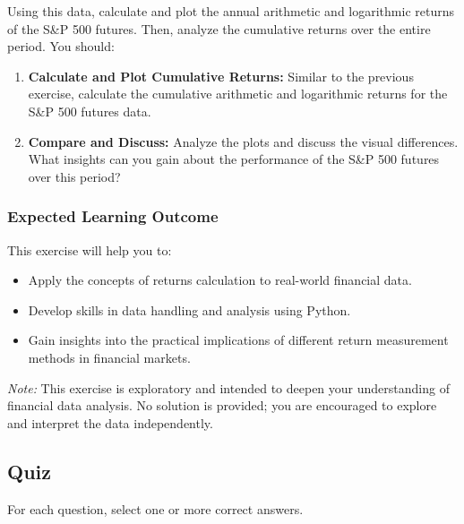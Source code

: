 \documentclass{article}
\begin{document}
Using this data, calculate and plot the annual arithmetic and logarithmic returns of the S\&P 500 futures. Then, analyze the cumulative returns over the entire period. You should:

\begin{enumerate}
    \item \textbf{Calculate and Plot Cumulative Returns:} Similar to the previous exercise, calculate the cumulative arithmetic and logarithmic returns for the S\&P 500 futures data.
    \item \textbf{Compare and Discuss:} Analyze the plots and discuss the visual differences. What insights can you gain about the performance of the S\&P 500 futures over this period?
\end{enumerate}

\subsubsection{Expected Learning Outcome}

This exercise will help you to:
\begin{itemize}
    \item Apply the concepts of returns calculation to real-world financial data.
    \item Develop skills in data handling and analysis using Python.
    \item Gain insights into the practical implications of different return measurement methods in financial markets.
\end{itemize}

\textit{Note:} This exercise is exploratory and intended to deepen your understanding of financial data analysis. No solution is provided; you are encouraged to explore and interpret the data independently.

\subsection{Quiz}
For each question, select one or more correct answers.
\end{document}
